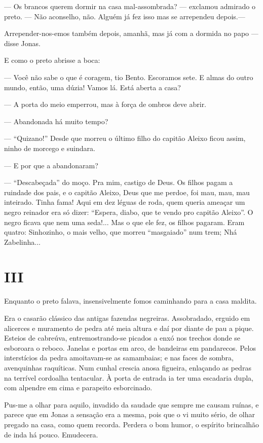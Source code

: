 --- Os brancos querem dormir na casa mal-assombrada? --- exclamou
admirado o preto. --- Não aconselho, não. Alguém já fez isso mas se
arrependeu depois.---

Arrepender-nos-emos também depois, amanhã, mas já com a dormida no papo
--- disse Jonas.

E como o preto abrisse a boca:

--- Você não sabe o que é coragem, tio Bento. Escoramos sete. E almas do
outro mundo, então, uma dúzia! Vamos lá. Está aberta a casa?

--- A porta do meio emperrou, mas à força de ombros deve abrir.

--- Abandonada há muito tempo?

--- ``Quizano!'' Desde que morreu o último filho do capitão Aleixo ficou
assim, ninho de morcego e suindara.

--- E por que a abandonaram?

--- ``Descabeçada'' do moço. Pra mim, castigo de Deus. Os filhos pagam a
ruindade dos pais, e o capitão Aleixo, Deus que me perdoe, foi mau, mau,
mau inteirado. Tinha fama! Aqui em dez léguas de roda, quem queria
ameaçar um negro reinador era só dizer: ``Espera, diabo, que te vendo
pro capitão Aleixo''. O negro ficava que nem uma seda!... Mas o que ele
fez, os filhos pagaram. Eram quatro: Sinhozinho, o mais velho, que
morreu ``masgaiado'' num trem; Nhá Zabelinha...

\section{III}

Enquanto o preto falava, insensivelmente fomos caminhando para a casa
maldita.

Era o casarão clássico das antigas fazendas negreiras. Assobradado,
erguido em alicerces e muramento de pedra até meia altura e daí por
diante de pau a pique. Esteios de cabreúva, entremostrando-se picados a
enxó nos trechos donde se esboroara o reboco. Janelas e portas em arco,
de bandeiras em pandarecos. Pelos interstícios da pedra amoitavam-se as
samambaias; e nas faces de sombra, avenquinhas raquíticas. Num cunhal
crescia anosa figueira, enlaçando as pedras na terrível cordoalha
tentacular. À porta de entrada ia ter uma escadaria dupla, com alpendre
em cima e parapeito esborcinado.

Pus-me a olhar para aquilo, invadido da saudade que sempre me causam
ruínas, e parece que em Jonas a sensação era a mesma, pois que o vi
muito sério, de olhar pregado na casa, como quem recorda. Perdera o bom
humor, o espírito brincalhão de inda há pouco. Emudecera.

